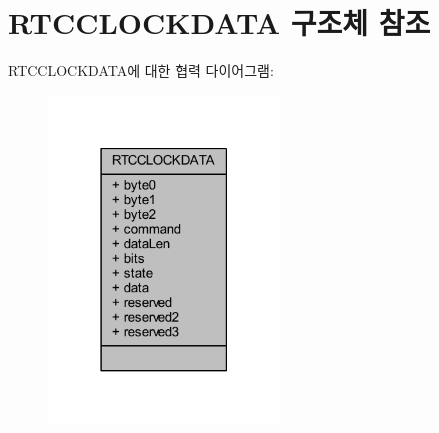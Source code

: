 \hypertarget{struct_r_t_c_c_l_o_c_k_d_a_t_a}{}\section{R\+T\+C\+C\+L\+O\+C\+K\+D\+A\+TA 구조체 참조}
\label{struct_r_t_c_c_l_o_c_k_d_a_t_a}


R\+T\+C\+C\+L\+O\+C\+K\+D\+A\+T\+A에 대한 협력 다이어그램\+:\nopagebreak
\begin{figure}[H]
\begin{center}
\leavevmode
\includegraphics[width=174pt]{struct_r_t_c_c_l_o_c_k_d_a_t_a__coll__graph}
\end{center}
\end{figure}

